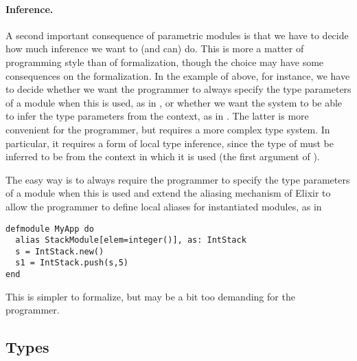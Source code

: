 \documentclass[a4paper,10pt]{article}
\begin{document}
\paragraph{Inference.} A second important consequence of parametric modules is that we have to decide how much inference we want to (and can) do. This is more a matter of programming style than of formalization, though the choice may have some consequences on the formalization.
In the example of  above, for instance, we have to decide whether we want the programmer to always specify the type parameters of a module when this is used, as in , or whether we want the system to be able to infer the type parameters from the context, as in . The latter is more convenient for the programmer, but requires a more complex type system. In particular, it requires a form of local type inference, since the type of  must be inferred to be  from the context in which it is used (the first argument of ). 

The easy way is to always require the programmer to specify the type parameters of a module when this is used and extend the aliasing mechanism of Elixir to allow the programmer to define local aliases for instantiated modules, as in
\begin{verbatim}
defmodule MyApp do
  alias StackModule[elem=integer()], as: IntStack
  s = IntStack.new()
  s1 = IntStack.push(s,5)
end
\end{verbatim}
This is simpler to formalize, but may be a bit too demanding for the programmer.



\subsection{Types}\label{sec:types}
\end{document}
